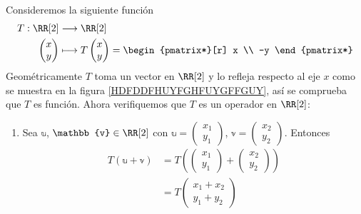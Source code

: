\begin{examplebox}{}{}
    Consideremos la siguiente función
    \begin{align*}
        T: \RR[2] & \longrightarrow \RR[2] \\
        \begin{pmatrix}
            x \\
            y
        \end{pmatrix} & \longmapsto T \begin{pmatrix}
            x \\
            y
        \end{pmatrix} = \begin{pmatrix*}[r]
            x \\
            -y
        \end{pmatrix*}
    \end{align*}
    Geométricamente $T$ toma un vector en $\RR[2]$ y lo refleja respecto al eje $x$ como se muestra en la figura \ref{HDFDDFHUYFGHFUYGFFGUY}, así se comprueba que $T$ es función. Ahora verifiquemos que $T$ es un operador en $\RR[2]$:
    \begin{enumerate}[label=\roman*), topsep=6pt, itemsep=0pt]
        \item Sea $\mathbb{u}$, $\mathbb{v} \in \RR[2]$ con $\mathbb{u} = \begin{pmatrix}
            x_1 \\
            y_1
        \end{pmatrix}$, $\mathbb{v} = \begin{pmatrix}
            x_2 \\
            y_2
        \end{pmatrix}$. Entonces
        \begin{align*}
            T(\mathbb{u} + \mathbb{v}) & = T\left( \begin{pmatrix}
                x_1 \\
                y_1
            \end{pmatrix} + \begin{pmatrix}
                x_2 \\
                y_2
            \end{pmatrix} \right) \\
            & = T \begin{pmatrix}
                x_1 + x_2 \\
                y_1 + y_2
            \end{pmatrix} \\

\end{align*}
\end{enumerate}
\end{examplebox}
